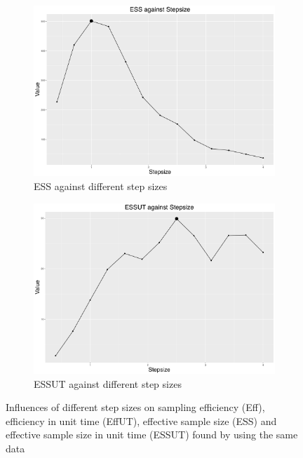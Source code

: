 \begin{figure}[h]
\begin{subfigure}[t]{0.45\textwidth}
	\includegraphics[width=\textwidth]{Chapters/05MCMCOU/plots/ggess.pdf}
	\caption{ESS against different step sizes}
\end{subfigure}
\begin{subfigure}[t]{0.45\textwidth}
	\includegraphics[width=\textwidth]{Chapters/05MCMCOU/plots/ggessut.pdf}
	\caption{ESSUT against different step sizes}
\end{subfigure}
\caption{Influences of different step sizes on sampling efficiency (Eff), efficiency in unit time (EffUT), effective sample size (ESS) and effective sample size in unit time (ESSUT) found by using the same data}
\label{effeutessessutexamplefigure}
\end{figure}



